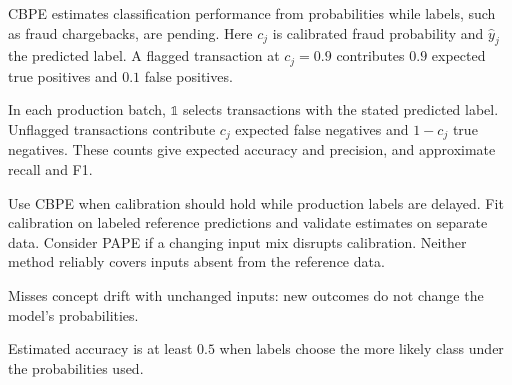 CBPE estimates classification performance from probabilities while labels, such as fraud chargebacks, are pending. Here $c_j$ is calibrated fraud probability and $\hat{y}_j$ the predicted label. A flagged transaction at $c_j=0.9$ contributes $0.9$ expected true positives and $0.1$ false positives.

\begin{metricformula}
\end{metricformula}

In each production batch, $\mathds{1}$ selects transactions with the stated predicted label. Unflagged transactions contribute $c_j$ expected false negatives and $1-c_j$ true negatives. These counts give expected accuracy and precision, and approximate recall and F1.


Use CBPE when calibration should hold while production labels are delayed. Fit calibration on labeled reference predictions and validate estimates on separate data. Consider PAPE if a changing input mix disrupts calibration. Neither method reliably covers inputs absent from the reference data.


{
\item Misses concept drift with unchanged inputs: new outcomes do not change the model's probabilities.
\item Estimated accuracy is at least $0.5$ when labels choose the more likely class under the probabilities used.
}

